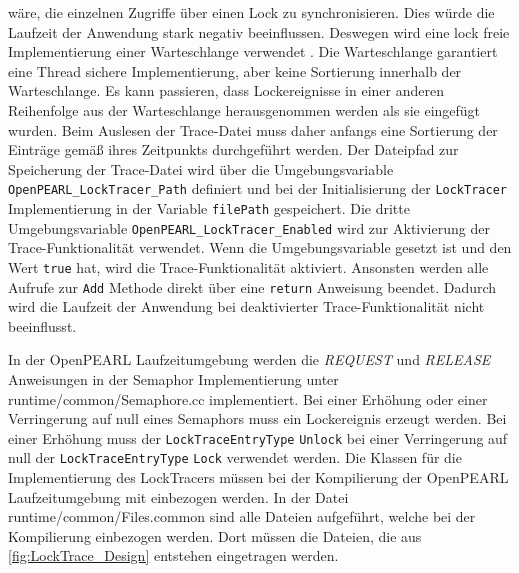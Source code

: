 wäre, die einzelnen Zugriffe über einen Lock zu synchronisieren. Dies würde die
Laufzeit der Anwendung stark negativ beeinflussen. Deswegen wird eine lock freie
Implementierung einer Warteschlange verwendet
\autocite{Moody_Camels_Concurrentqueue}. Die Warteschlange garantiert eine
Thread sichere Implementierung, aber keine Sortierung innerhalb der
Warteschlange. Es kann passieren, dass Lockereignisse in einer anderen
Reihenfolge aus der Warteschlange herausgenommen werden als sie eingefügt
wurden. Beim Auslesen der Trace-Datei muss daher anfangs eine Sortierung der
Einträge gemäß ihres Zeitpunkts durchgeführt werden. Der Dateipfad zur
Speicherung der Trace-Datei wird über die Umgebungsvariable
\texttt{OpenPEARL\_LockTracer\_Path} definiert und bei der Initialisierung der
\texttt{LockTracer} Implementierung in der Variable \texttt{filePath}
gespeichert. Die dritte Umgebungsvariable
\texttt{OpenPEARL\_LockTracer\_Enabled} wird zur Aktivierung der
Trace-Funktionalität verwendet. Wenn die Umgebungsvariable gesetzt ist und den
Wert \texttt{true} hat, wird die Trace-Funktionalität aktiviert. Ansonsten
werden alle Aufrufe zur \texttt{Add} Methode direkt über eine \texttt{return}
Anweisung beendet. Dadurch wird die Laufzeit der Anwendung bei deaktivierter
Trace-Funktionalität nicht beeinflusst.

In der OpenPEARL Laufzeitumgebung werden die \emph{REQUEST} und \emph{RELEASE}
Anweisungen in der Semaphor Implementierung unter runtime/common/Semaphore.cc
implementiert. Bei einer Erhöhung oder einer Verringerung auf null eines
Semaphors muss ein Lockereignis erzeugt werden. Bei einer Erhöhung muss der
\texttt{LockTraceEntryType} \texttt{Unlock} bei einer Verringerung auf null der
\texttt{LockTraceEntryType} \texttt{Lock} verwendet werden. Die Klassen für die
Implementierung des LockTracers müssen bei der Kompilierung der OpenPEARL
Laufzeitumgebung mit einbezogen werden. In der Datei runtime/common/Files.common
sind alle Dateien aufgeführt, welche bei der Kompilierung einbezogen werden.
Dort müssen die Dateien, die aus \cref{fig:LockTrace_Design} entstehen
eingetragen werden.

